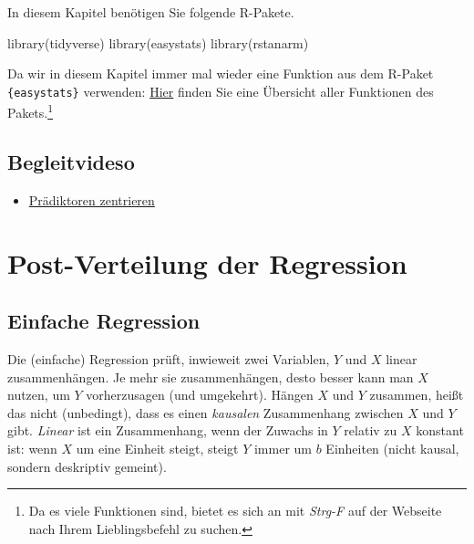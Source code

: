\documentclass[
  a4paper,
  DIV=11]{scrreprt}
\newenvironment{Shaded}{\begin{snugshade}}{\end{snugshade}}
\newcommand{\FunctionTok}[1]{\textcolor[rgb]{0.28,0.35,0.67}{#1}}
\newcommand{\NormalTok}[1]{\textcolor[rgb]{0.00,0.23,0.31}{#1}}
\providecommand{\tightlist}{%
  \setlength{\itemsep}{0pt}\setlength{\parskip}{0pt}}\usepackage{longtable,booktabs,array}
\theoremstyle{definition}
\theoremstyle{remark}
\begin{document}
In diesem Kapitel benötigen Sie folgende R-Pakete.

\begin{Shaded}
\begin{Highlighting}[]
\FunctionTok{library}\NormalTok{(tidyverse)}
\FunctionTok{library}\NormalTok{(easystats)}
\FunctionTok{library}\NormalTok{(rstanarm)}
\end{Highlighting}
\end{Shaded}

Da wir in diesem Kapitel immer mal wieder eine Funktion aus dem R-Paket
\texttt{\{easystats\}} verwenden:
\href{https://easystats.github.io/easystats/articles/list_of_functions.html}{Hier}
finden Sie eine Übersicht aller Funktionen des Pakets.\footnote{Da es
  viele Funktionen sind, bietet es sich an mit \emph{Strg-F} auf der
  Webseite nach Ihrem Lieblingsbefehl zu suchen.}

\hypertarget{begleitvideso}{%
\subsection{Begleitvideso}\label{begleitvideso}}

\begin{itemize}
\tightlist
\item
  \href{https://youtu.be/3Z1dXPO_MSE}{Prädiktoren zentrieren}
\end{itemize}

\hypertarget{post-verteilung-der-regression}{%
\section{Post-Verteilung der
Regression}\label{post-verteilung-der-regression}}

\hypertarget{einfache-regression}{%
\subsection{Einfache Regression}\label{einfache-regression}}

Die (einfache) Regression prüft, inwieweit zwei Variablen, \(Y\) und
\(X\) linear zusammenhängen. Je mehr sie zusammenhängen, desto besser
kann man \(X\) nutzen, um \(Y\) vorherzusagen (und umgekehrt). Hängen
\(X\) und \(Y\) zusammen, heißt das nicht (unbedingt), dass es einen
\emph{kausalen} Zusammenhang zwischen \(X\) und \(Y\) gibt.
\emph{Linear} ist ein Zusammenhang, wenn der Zuwachs in \(Y\) relativ zu
\(X\) konstant ist: wenn \(X\) um eine Einheit steigt, steigt \(Y\)
immer um \(b\) Einheiten (nicht kausal, sondern deskriptiv gemeint).
\end{document}
